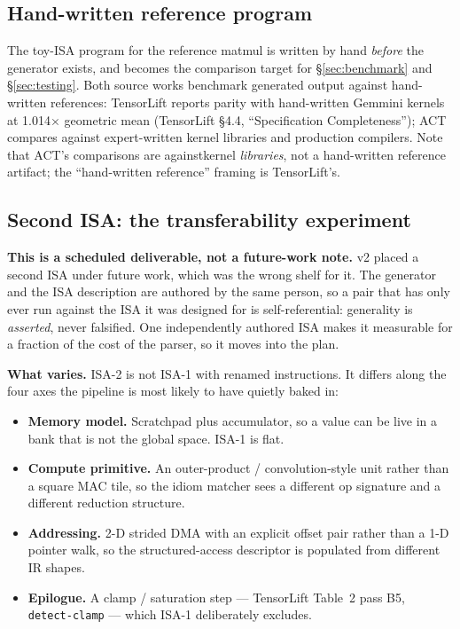 \documentclass[11pt,a4paper]{article}
\newcommand{\code}[1]{\texttt{\small\hyphenchar\font=45 #1}}
\begin{document}
\subsection{Hand-written reference program}

The toy-ISA program for the reference matmul is written by hand \emph{before} the generator exists, and
becomes the comparison target for \S\ref{sec:benchmark} and \S\ref{sec:testing}. Both source works benchmark
generated output against hand-written references: TensorLift reports parity with hand-written Gemmini
kernels at 1.014$\times$ geometric mean (TensorLift \S4.4, ``Specification Completeness''); ACT compares
against expert-written kernel libraries and production compilers. Note that ACT's comparisons are againstkernel \emph{libraries}, not a hand-written reference artifact; the ``hand-written reference'' framing is
TensorLift's.

\subsection{Second ISA: the transferability experiment}\label{sec:isa2}

\noindent\textbf{This is a scheduled deliverable, not a future-work note.} v2 placed a second ISA under
future work, which was the wrong shelf for it. The generator and the ISA description are authored by the same
person, so a pair that has only ever run against the ISA it was designed for is self-referential:
generality is \emph{asserted}, never falsified. One independently authored ISA makes it measurable for a
fraction of the cost of the parser, so it moves into the plan.

\noindent\textbf{What varies.} ISA-2 is not ISA-1 with renamed instructions. It differs along the four axes
the pipeline is most likely to have quietly baked in:

\begin{itemize}[leftmargin=1.3em,itemsep=0.25em]
\item \textbf{Memory model.} Scratchpad plus accumulator, so a value can be live in a bank that is not the
      global space. ISA-1 is flat.
\item \textbf{Compute primitive.} An outer-product / convolution-style unit rather than a square MAC tile, so
      the idiom matcher sees a different op signature and a different reduction structure.
\item \textbf{Addressing.} 2-D strided DMA with an explicit offset pair rather than a 1-D pointer walk, so the
      structured-access descriptor is populated from different IR shapes.
\item \textbf{Epilogue.} A clamp / saturation step --- TensorLift Table~2 pass B5, \code{detect-clamp} ---
      which ISA-1 deliberately excludes.
\end{itemize}
\end{document}
